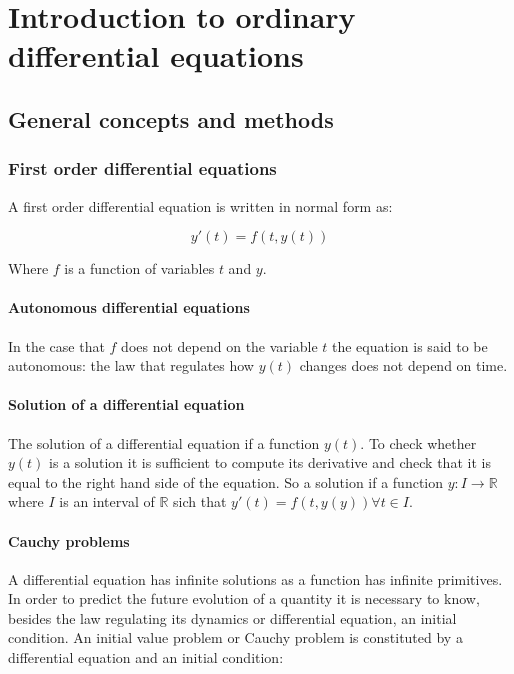 \chapter{Introduction to ordinary differential equations}

\section{General concepts and methods}

	\subsection{First order differential equations}
	A first order differential equation is written in normal form as:

	$$y'(t) = f(t, y(t))$$

	Where $f$ is a function of variables $t$ and $y$.

		\subsubsection{Autonomous differential equations}
		In the case that $f$ does not depend on the variable $t$ the equation is said to be autonomous: the law that regulates how $y(t)$ changes does not depend on time.

		\subsubsection{Solution of a differential equation}
		The solution of a differential equation if a function $y(t)$.
		To check whether $y(t)$ is a solution it is sufficient to compute its derivative and check that it is equal to the right hand side of the equation.
		So a solution if a function $y:I\rightarrow\mathbb{R}$ where $I$ is an interval of $\mathbb{R}$ sich that $y'(t) = f(t,y(y))\forall t\in I$.

		\subsubsection{Cauchy problems}
		A differential equation has infinite solutions as a function has infinite primitives.
		In order to predict the future evolution of a quantity it is necessary to know, besides the law regulating its dynamics or differential equation, an initial condition.
		An initial value problem or Cauchy problem is constituted by a differential equation and an initial condition:

